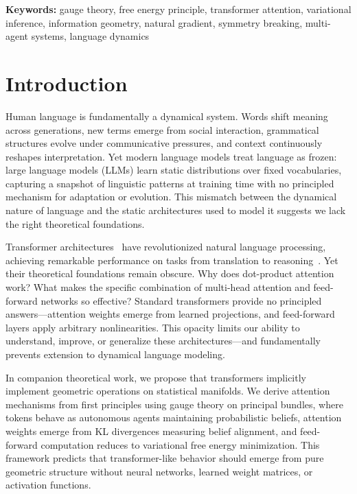 \documentclass[twoside,11pt]{article}
\begin{document}
\noindent\textbf{Keywords:} gauge theory, free energy principle, transformer attention, variational inference, information geometry, natural gradient, symmetry breaking, multi-agent systems, language dynamics

\section{Introduction}

Human language is fundamentally a dynamical system. Words shift meaning across generations, new terms emerge from social interaction, grammatical structures evolve under communicative pressures, and context continuously reshapes interpretation. Yet modern language models treat language as frozen: large language models (LLMs) learn static distributions over fixed vocabularies, capturing a snapshot of linguistic patterns at training time with no principled mechanism for adaptation or evolution. This mismatch between the dynamical nature of language and the static architectures used to model it suggests we lack the right theoretical foundations.

Transformer architectures~\citep{vaswani2017attention} have revolutionized natural language processing, achieving remarkable performance on tasks from translation to reasoning~\citep{devlin2018bert,radford2019language,brown2020language}. Yet their theoretical foundations remain obscure. Why does dot-product attention work? What makes the specific combination of multi-head attention and feed-forward networks so effective? Standard transformers provide no principled answers---attention weights emerge from learned projections, and feed-forward layers apply arbitrary nonlinearities. This opacity limits our ability to understand, improve, or generalize these architectures---and fundamentally prevents extension to dynamical language modeling.

In companion theoretical work, we propose that transformers implicitly implement geometric operations on statistical manifolds. We derive attention mechanisms from first principles using gauge theory on principal bundles, where tokens behave as autonomous agents maintaining probabilistic beliefs, attention weights emerge from KL divergences measuring belief alignment, and feed-forward computation reduces to variational free energy minimization. This framework predicts that transformer-like behavior should emerge from pure geometric structure without neural networks, learned weight matrices, or activation functions.
\end{document}
